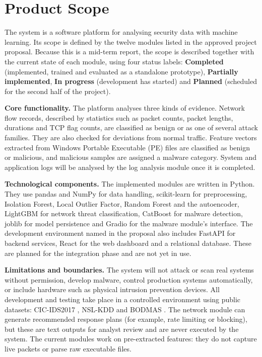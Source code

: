 \section{Product Scope}

The system is a software platform for analysing security data with machine learning. Its scope is defined by the twelve modules listed in the approved project proposal. Because this is a mid-term report, the scope is described together with the current state of each module, using four status labels: \textbf{Completed} (implemented, trained and evaluated as a standalone prototype), \textbf{Partially implemented}, \textbf{In progress} (development has started) and \textbf{Planned} (scheduled for the second half of the project).

\textbf{Core functionality.} The platform analyses three kinds of evidence. Network flow records, described by statistics such as packet counts, packet lengths, durations and TCP flag counts, are classified as benign or as one of several attack families. They are also checked for deviations from normal traffic. Feature vectors extracted from Windows Portable Executable (PE) files are classified as benign or malicious, and malicious samples are assigned a malware category. System and application logs will be analysed by the log analysis module once it is completed.

\textbf{Technological components.} The implemented modules are written in Python. They use pandas and NumPy for data handling, scikit-learn \cite{pedregosa2011sklearn} for preprocessing, Isolation Forest, Local Outlier Factor, Random Forest and the autoencoder, LightGBM \cite{ke2017lightgbm} for network threat classification, CatBoost \cite{prokhorenkova2018catboost} for malware detection, joblib for model persistence and Gradio \cite{abid2019gradio} for the malware module's interface. The development environment named in the proposal also includes FastAPI for backend services, React for the web dashboard and a relational database. These are planned for the integration phase and are not yet in use.

\textbf{Limitations and boundaries.} The system will not attack or scan real systems without permission, develop malware, control production systems automatically, or include hardware such as physical intrusion prevention devices. All development and testing take place in a controlled environment using public datasets: CIC-IDS2017 \cite{sharafaldin2018cicids}, NSL-KDD \cite{tavallaee2009nslkdd} and BODMAS \cite{yang2021bodmas}. The network module can generate recommended response plans (for example, rate limiting or blocking), but these are text outputs for analyst review and are never executed by the system. The current modules work on pre-extracted features: they do not capture live packets or parse raw executable files.


